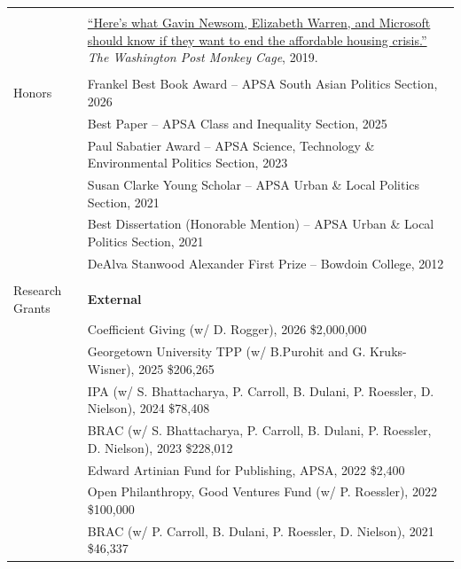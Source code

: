 \documentclass[letterpaper, 10.5pt]{article}
\begin{document}
\begin{longtable}{p{1.5in}p{5in}}
& \\

& \href{https://www.washingtonpost.com/news/monkey-cage/wp/2019/01/31/heres-what-gavin-newsom-elizabeth-warren-and-microsoft-should-know-if-want-to-end-the-affordable-housing-crisis/?tid=sm_tw_cage}{``Here's what Gavin Newsom, Elizabeth Warren, and Microsoft should know if they want to end the affordable housing crisis.''} \textit{The Washington Post Monkey Cage}, 2019.\\



&\\




{{Honors}} 
& Frankel Best Book Award -- APSA South Asian Politics Section, 2026\\
& Best Paper -- APSA Class and Inequality Section, 2025\\
& Paul Sabatier Award -- APSA Science, Technology \& Environmental Politics Section, 2023\\
& Susan Clarke Young Scholar -- APSA Urban \& Local Politics Section, 2021\\

& Best Dissertation  (Honorable Mention) -- APSA Urban \& Local Politics Section, 2021 \\
& DeAlva Stanwood Alexander First Prize -- Bowdoin College, 2012 \\

& \\

{{Research Grants}} 
& \textbf{External}\\
& Coefficient Giving (w/ D. Rogger), 2026 \hfill \$2,000,000\\
& Georgetown University TPP (w/ B.Purohit and G. Kruks-Wisner), 2025 \hfill \$206,265\\
& IPA (w/ S. Bhattacharya, P. Carroll, B. Dulani, P. Roessler,  D. Nielson), 2024 \hfill \$78,408\\
& BRAC (w/ S. Bhattacharya, P. Carroll, B. Dulani, P. Roessler,  D. Nielson), 2023
 \hfill \$228,012\\

& Edward Artinian Fund for Publishing, APSA, 2022 \hfill \$2,400\\
& Open Philanthropy, Good Ventures Fund (w/ P. Roessler), 2022 \hfill \$100,000\\
& BRAC (w/ P. Carroll, B. Dulani, P. Roessler,  D. Nielson), 2021
 \hfill \$46,337\\



\end{longtable}
\end{document}

